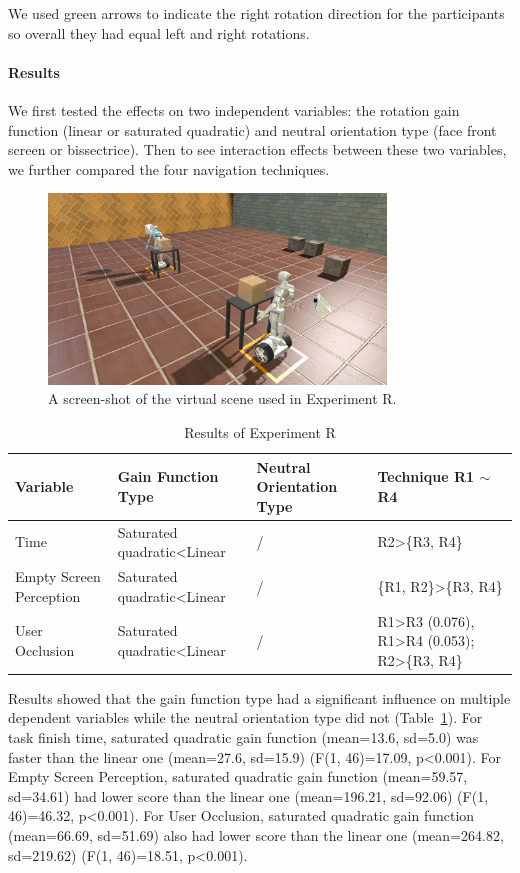 We used green arrows to indicate the right rotation direction for the participants so overall they had equal left and right rotations.

\paragraph{Results}
We first tested the effects on two independent variables: the rotation gain function (linear or saturated quadratic) and neutral orientation type (face front screen or bissectrice). Then to see interaction effects between these two variables, we further compared the four navigation techniques.

\begin{figure}[tb]
  \centering
  \includegraphics[width=0.8\textwidth]{figures/3_t2}
  \caption{\label{fig:3_task2}A screen-shot of the virtual scene used in Experiment R.}
\end{figure}

\begin{table}[!t]
\renewcommand{\arraystretch}{1.3}
\caption{Results of Experiment R}
\label{tab:3_result_t2}
\centering
\begin{tabular}{l l l l}
  \hline
  Variable & Gain Function Type & Neutral Orientation Type & Technique R1 $\sim$ R4 \\
  \hline
  Time & Saturated quadratic\textless Linear & / & R2\textgreater \{R3, R4\} \\
  Empty Screen Perception & Saturated quadratic\textless Linear & / & \{R1, R2\}\textgreater\{R3, R4\} \\
  User Occlusion & Saturated quadratic\textless Linear & / & R1\textgreater R3 (0.076), R1\textgreater R4 (0.053); R2\textgreater \{R3, R4\} \\
  \hline
\end{tabular}
\end{table}

Results showed that the gain function type had a significant influence on multiple dependent variables while the neutral orientation type did not (Table~\ref{tab:3_result_t2}). For task finish time, saturated quadratic gain function (mean=13.6, sd=5.0) was faster than the linear one (mean=27.6, sd=15.9) (F(1, 46)=17.09, p\textless 0.001). For Empty Screen Perception, saturated quadratic gain function (mean=59.57, sd=34.61) had lower score than the linear one (mean=196.21, sd=92.06) (F(1, 46)=46.32, p\textless 0.001). For User Occlusion, saturated quadratic gain function (mean=66.69, sd=51.69) also had lower score than the linear one (mean=264.82, sd=219.62) (F(1, 46)=18.51, p\textless 0.001).



